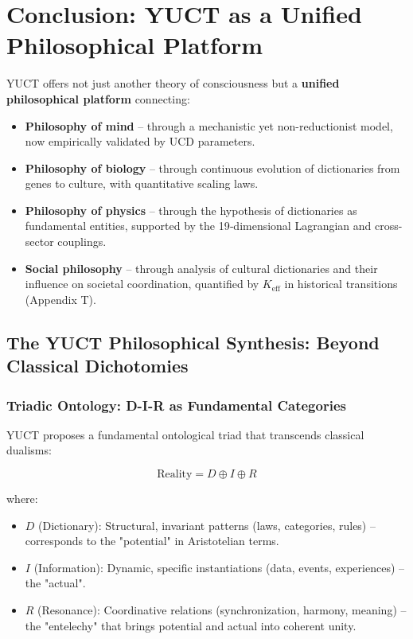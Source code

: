 \documentclass[12pt,a4paper]{article}
\newcommand{\eff}{\mathrm{eff}}
\newcommand{\Ke}{K_{\eff}}
\begin{document}
	\section{Conclusion: YUCT as a Unified Philosophical Platform}
	
	YUCT offers not just another theory of consciousness but a \textbf{unified philosophical platform} connecting:
	\begin{itemize}
		\item \textbf{Philosophy of mind} – through a mechanistic yet non-reductionist model, now empirically validated by UCD parameters.
		\item \textbf{Philosophy of biology} – through continuous evolution of dictionaries from genes to culture, with quantitative scaling laws.
		\item \textbf{Philosophy of physics} – through the hypothesis of dictionaries as fundamental entities, supported by the 19‑dimensional Lagrangian and cross-sector couplings.
		\item \textbf{Social philosophy} – through analysis of cultural dictionaries and their influence on societal coordination, quantified by $\Ke$ in historical transitions (Appendix T).
	\end{itemize}
	
	\subsection{The YUCT Philosophical Synthesis: Beyond Classical Dichotomies}
	
	\subsubsection{Triadic Ontology: D-I-R as Fundamental Categories}
	
	YUCT proposes a fundamental ontological triad that transcends classical dualisms:
	
	\[
	\text{Reality} = D \oplus I \oplus R
	\]
	
	where:
	\begin{itemize}
		\item $D$ (Dictionary): Structural, invariant patterns (laws, categories, rules) – corresponds to the "potential" in Aristotelian terms.
		\item $I$ (Information): Dynamic, specific instantiations (data, events, experiences) – the "actual".
		\item $R$ (Resonance): Coordinative relations (synchronization, harmony, meaning) – the "entelechy" that brings potential and actual into coherent unity.
	\end{itemize}
	
\end{document}
